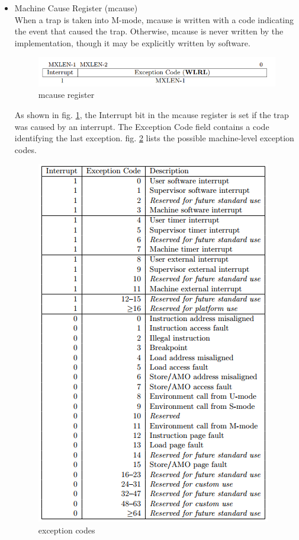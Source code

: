 \documentclass[../main.tex]{subfiles}
\begin{document}
\begin{itemize}
    \item Machine Cause Register (mcause)\\
        When a trap is taken into M-mode, mcause is written with a code indicating the event that caused the trap. Otherwise, mcause is never written by the implementation, though it may be explicitly written by software.\\
        \begin{figure}[h]
            \centering
            \includegraphics[width=10 cm]{diagrams/mcause.png}
            \caption{mcause register}
            \label{fig:mcause}
        \end{figure}
        As shown in fig. \ref{fig:mcause}, the Interrupt bit in the mcause register is set if the trap was caused by an interrupt. The Exception Code field contains a code identifying the last exception. fig. \ref{fig:exception-code} lists the possible machine-level exception codes.\\
        \begin{figure}[h!]
            \centering
            \includegraphics[width=10 cm]{diagrams/exception_code.png}
            \caption{exception codes}
            \label{fig:exception-code}
        \end{figure}
        

\end{itemize}
\end{document}

